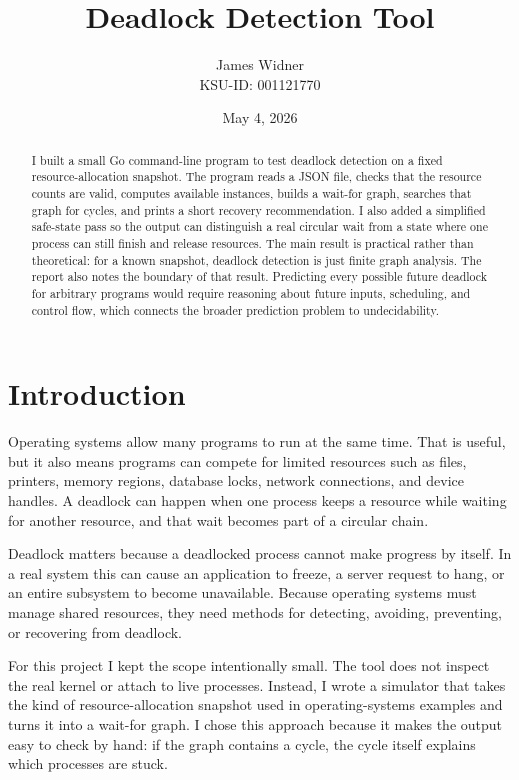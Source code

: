 \documentclass[10pt]{article}
\title{Deadlock Detection Tool}
\author{James Widner\\KSU-ID: 001121770}
\date{May 4, 2026}
\begin{document}
\maketitle

\begin{abstract}
I built a small Go command-line program to test deadlock detection on a fixed resource-allocation snapshot. The program reads a JSON file, checks that the resource counts are valid, computes available instances, builds a wait-for graph, searches that graph for cycles, and prints a short recovery recommendation. I also added a simplified safe-state pass so the output can distinguish a real circular wait from a state where one process can still finish and release resources. The main result is practical rather than theoretical: for a known snapshot, deadlock detection is just finite graph analysis. The report also notes the boundary of that result. Predicting every possible future deadlock for arbitrary programs would require reasoning about future inputs, scheduling, and control flow, which connects the broader prediction problem to undecidability.
\end{abstract}

\section{Introduction}

Operating systems allow many programs to run at the same time. That is useful, but it also means programs can compete for limited resources such as files, printers, memory regions, database locks, network connections, and device handles. A deadlock can happen when one process keeps a resource while waiting for another resource, and that wait becomes part of a circular chain.

Deadlock matters because a deadlocked process cannot make progress by itself. In a real system this can cause an application to freeze, a server request to hang, or an entire subsystem to become unavailable. Because operating systems must manage shared resources, they need methods for detecting, avoiding, preventing, or recovering from deadlock.

For this project I kept the scope intentionally small. The tool does not inspect the real kernel or attach to live processes. Instead, I wrote a simulator that takes the kind of resource-allocation snapshot used in operating-systems examples and turns it into a wait-for graph. I chose this approach because it makes the output easy to check by hand: if the graph contains a cycle, the cycle itself explains which processes are stuck.
\end{document}
